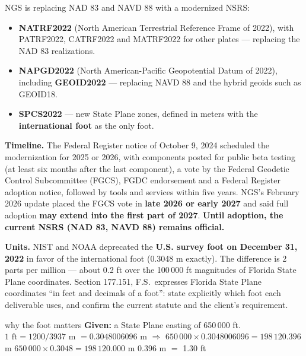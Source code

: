 \begin{eng}
NGS is replacing NAD 83 and NAVD 88 with a modernized NSRS:
\begin{itemize}
\item \textbf{NATRF2022} (North American Terrestrial Reference Frame of 2022), with PATRF2022, CATRF2022 and MATRF2022 for other plates --- replacing the NAD 83 realizations.
\item \textbf{NAPGD2022} (North American-Pacific Geopotential Datum of 2022), including \textbf{GEOID2022} --- replacing NAVD 88 and the hybrid geoids such as GEOID18.
\item \textbf{SPCS2022} --- new State Plane zones, defined in meters with the \textbf{international foot} as the only foot.
\end{itemize}
\textbf{Timeline.} The Federal Register notice of October 9, 2024 scheduled the modernization for 2025 or 2026, with components posted for public beta testing (at least six months after the last component), a vote by the Federal Geodetic Control Subcommittee (FGCS), FGDC endorsement and a Federal Register adoption notice, followed by tools and services within five years. NGS's February 2026 update placed the FGCS vote in \textbf{late 2026 or early 2027} and said full adoption \textbf{may extend into the first part of 2027}. \textbf{Until adoption, the current NSRS (NAD 83, NAVD 88) remains official.}

\textbf{Units.} NIST and NOAA deprecated the \textbf{U.S. survey foot on December 31, 2022} in favor of the international foot (0.3048 m exactly). The difference is 2 parts per million --- about 0.2 ft over the 100\,000 ft magnitudes of Florida State Plane coordinates. Section 177.151, F.S.\ expresses Florida State Plane coordinates ``in feet and decimals of a foot'': state explicitly which foot each deliverable uses, and confirm the current statute and the client's requirement.
\end{eng}

\begin{worked}{why the foot matters}
\textbf{Given:} a State Plane easting of 650\,000 ft.
 $1\text{ ft}=1200/3937$ m $=0.3048006096$ m $\Rightarrow$ $650\,000\times0.3048006096=198\,120.396$ m
 $650\,000\times0.3048=198\,120.000$ m
 0.396 m $=$ 1.30 ft
\end{worked}


